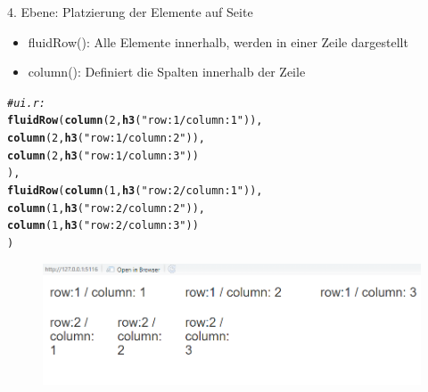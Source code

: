 \documentclass[xcolor=dvipsnames]{beamer}\usepackage[]{graphicx}\usepackage[]{color}
\makeatletter
\newcommand{\hlstr}[1]{\textcolor[rgb]{0.192,0.494,0.8}{#1}}%
\newcommand{\hlcom}[1]{\textcolor[rgb]{0.678,0.584,0.686}{\textit{#1}}}%
\newcommand{\hlkwd}[1]{\textcolor[rgb]{0.737,0.353,0.396}{\textbf{#1}}}%
\newenvironment{kframe}{%
 \def\at@end@of@kframe{}%
 \ifinner\ifhmode%
  \def\at@end@of@kframe{\end{minipage}}%
  \begin{minipage}{\columnwidth}%
 \fi\fi%
 \def\FrameCommand##1{\hskip\@totalleftmargin \hskip-\fboxsep
 \colorbox{shadecolor}{##1}\hskip-\fboxsep
     \hskip-\linewidth \hskip-\@totalleftmargin \hskip\columnwidth}%
 \MakeFramed {\advance\hsize-\width
   \@totalleftmargin\z@ \linewidth\hsize
   \@setminipage}}%
 {\par\unskip\endMakeFramed%
 \at@end@of@kframe}
\newenvironment{knitrout}{}{} %
\makeatother
\begin{document}
        
\begin{frame}[fragile]{4. Ebene: Platzierung der Elemente auf Seite}        
  \begin{itemize}
    \item fluidRow(): Alle Elemente innerhalb, werden in einer Zeile dargestellt
    \item column(): Definiert die Spalten innerhalb der Zeile
  \end{itemize} 
\begin{knitrout}\small
{}\color{fgcolor}\begin{kframe}
\begin{alltt}
\hlcom{#ui.r:}
\hlkwd{fluidRow}(\hlkwd{column}(2, \hlkwd{h3}(\hlstr{"row:1 / column: 1"})),
         \hlkwd{column}(2, \hlkwd{h3}(\hlstr{"row:1 / column: 2"})),
         \hlkwd{column}(2, \hlkwd{h3}(\hlstr{"row:1 / column: 3"}))
),
\hlkwd{fluidRow}(\hlkwd{column}(1, \hlkwd{h3}(\hlstr{"row:2 / column: 1"})),
         \hlkwd{column}(1, \hlkwd{h3}(\hlstr{"row:2 / column: 2"})),
         \hlkwd{column}(1, \hlkwd{h3}(\hlstr{"row:2 / column: 3"}))
)
\end{alltt}
\end{kframe}
\end{knitrout}
  \begin{figure}
  	\centering
  	\includegraphics[width=1\textwidth]{figure/fluidRowandcolumn.png}
  \end{figure}  
\end{frame}
\end{document}
